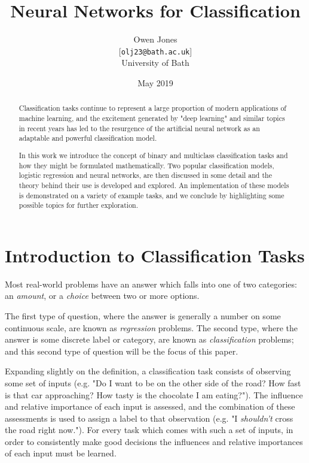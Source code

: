 \documentclass{article}[11pt]
\title{Neural Networks for Classification}
\author{
    Owen Jones \\
    {[\texttt{olj23@bath.ac.uk}]} \\
    University of Bath
}
\date{May 2019}
\begin{document}
	
\maketitle


\begin{abstract}
    
    Classification tasks continue to represent a large proportion of modern applications of machine learning, and the excitement generated by "deep learning" and similar topics in recent years has led to the resurgence of the artificial neural network as an adaptable and powerful classification model.
    
    In this work we introduce the concept of binary and multiclass classification tasks and how they might be formulated mathematically. Two popular classification models, logistic regression and neural networks, are then discussed in some detail and the theory behind their use is developed and explored. An implementation of these models is demonstrated on a variety of example tasks, and we conclude by highlighting some possible topics for further exploration.
    
\end{abstract}



\section{Introduction to Classification Tasks}
    
    Most real-world problems have an answer which falls into one of two categories: an \textit{amount}, or a \textit{choice} between two or more options.
    
    The first type of question, where the answer is generally a number on some continuous scale, are known as \textit{regression} problems. The second type, where the answer is some discrete label or category, are known as \textit{classification} problems; and this second type of question will be the focus of this paper.
    
    Expanding slightly on the definition, a classification task consists of observing some set of inputs (e.g. "Do I want to be on the other side of the road? How fast is that car approaching? How tasty is the chocolate I am eating?"). The influence and relative importance of each input is assessed, and the combination of these assessments is used to assign a label to that observation (e.g. "I \textit{shouldn't} cross the road right now."). For every task which comes with such a set of inputs, in order to consistently make good decisions the influences and relative importances of each input must be learned.
    
\end{document}
